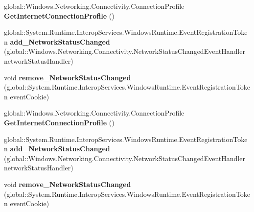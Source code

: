 \begin{DoxyCompactItemize}
global\+::\+Windows.\+Networking.\+Connectivity.\+Connection\+Profile {\bfseries Get\+Internet\+Connection\+Profile} ()
\item 
\mbox{\label{interface_windows_1_1_networking_1_1_connectivity_1_1_i_network_information_statics_a4a3e3682f51b9045eb6cda230e158f1f}} 
global\+::\+System.\+Runtime.\+Interop\+Services.\+Windows\+Runtime.\+Event\+Registration\+Token {\bfseries add\+\_\+\+Network\+Status\+Changed} (global\+::\+Windows.\+Networking.\+Connectivity.\+Network\+Status\+Changed\+Event\+Handler network\+Status\+Handler)
\item 
\mbox{\label{interface_windows_1_1_networking_1_1_connectivity_1_1_i_network_information_statics_a02ae9ff4dce202e50a3853e7bf5adbaa}} 
void {\bfseries remove\+\_\+\+Network\+Status\+Changed} (global\+::\+System.\+Runtime.\+Interop\+Services.\+Windows\+Runtime.\+Event\+Registration\+Token event\+Cookie)
\item 
\mbox{\label{interface_windows_1_1_networking_1_1_connectivity_1_1_i_network_information_statics_ad3ef05f2aa0e8eba2f3ec17040f38ea0}} 
global\+::\+Windows.\+Networking.\+Connectivity.\+Connection\+Profile {\bfseries Get\+Internet\+Connection\+Profile} ()
\item 
\mbox{\label{interface_windows_1_1_networking_1_1_connectivity_1_1_i_network_information_statics_a4a3e3682f51b9045eb6cda230e158f1f}} 
global\+::\+System.\+Runtime.\+Interop\+Services.\+Windows\+Runtime.\+Event\+Registration\+Token {\bfseries add\+\_\+\+Network\+Status\+Changed} (global\+::\+Windows.\+Networking.\+Connectivity.\+Network\+Status\+Changed\+Event\+Handler network\+Status\+Handler)
\item 
\mbox{\label{interface_windows_1_1_networking_1_1_connectivity_1_1_i_network_information_statics_a02ae9ff4dce202e50a3853e7bf5adbaa}} 
void {\bfseries remove\+\_\+\+Network\+Status\+Changed} (global\+::\+System.\+Runtime.\+Interop\+Services.\+Windows\+Runtime.\+Event\+Registration\+Token event\+Cookie)

\end{DoxyCompactItemize}
